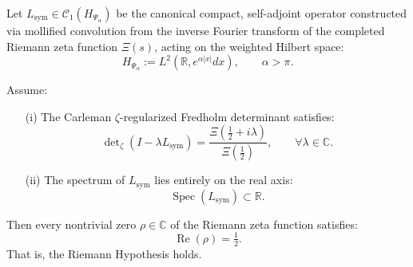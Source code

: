 \begin{lemma}
\label{lem:real_spectrum_implies_rh_rigidity}

Let \( L_{\mathrm{sym}} \in \mathcal{C}_1(H_{\Psi_\alpha}) \) be the canonical compact, self-adjoint operator constructed via mollified convolution from the inverse Fourier transform of the completed Riemann zeta function \( \Xi(s) \), acting on the weighted Hilbert space:
\[
H_{\Psi_\alpha} := L^2(\mathbb{R}, e^{\alpha |x|} dx), \qquad \alpha > \pi.
\]

Assume:
\begin{enumerate}
  \item[\textup{(i)}] The Carleman \(\zeta\)-regularized Fredholm determinant satisfies:
  \[
  \det\nolimits_\zeta(I - \lambda L_{\mathrm{sym}}) = \frac{\Xi\left(\tfrac{1}{2} + i\lambda\right)}{\Xi\left(\tfrac{1}{2}\right)}, \qquad \forall \lambda \in \mathbb{C}.
  \]

  \item[\textup{(ii)}] The spectrum of \( L_{\mathrm{sym}} \) lies entirely on the real axis:
  \[
  \operatorname{Spec}(L_{\mathrm{sym}}) \subset \mathbb{R}.
  \]
\end{enumerate}

Then every nontrivial zero \( \rho \in \mathbb{C} \) of the Riemann zeta function satisfies:
\[
\operatorname{Re}(\rho) = \tfrac{1}{2}.
\]
That is, the Riemann Hypothesis holds.
\end{lemma}
